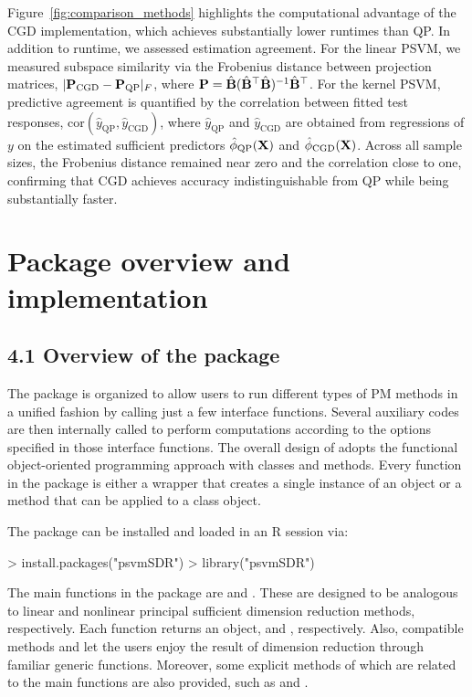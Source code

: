 {Figure~\ref{fig:comparison_methods} highlights the computational advantage of the CGD implementation, which achieves substantially lower runtimes than QP. In addition to runtime, we assessed estimation agreement. For the linear PSVM, we measured subspace similarity via the Frobenius distance between projection matrices, $|{\mathbf{P}}_{\mathrm{CGD}} - {\mathbf{P}}_{\mathrm{QP}}|_F$, where ${\mathbf{P}} = \hat{\mathbf{B}}(\hat{\mathbf{B}}^{\top}\hat{\mathbf{B}})^{-1}\hat{\mathbf{B}}^{\top}$. For the kernel PSVM, predictive agreement is quantified by the correlation between fitted test responses, $ \mathrm{cor}(\hat{y}_{\mathrm{QP}}, \hat{y}_{\mathrm{CGD}})$, where $\hat{y}_{\mathrm{QP}}$ and $\hat{y}_{\mathrm{CGD}}$ are obtained from regressions of $y$ on the estimated sufficient predictors $\hat{\phi}_{\mathrm{QP}}(\mathbf{X})$ and $\hat{\phi}_{\mathrm{CGD}}(\mathbf{X})$. Across all sample sizes, the Frobenius distance remained near zero and the correlation close to one, confirming that CGD achieves accuracy indistinguishable from QP while being substantially faster.}

\section{Package overview and implementation}\label{sec:overview}
\subsection{4.1 Overview of the package }
The  package is organized to allow users to run different types of PM methods in a unified fashion by calling just a few interface functions. Several auxiliary codes are then internally called to perform computations according to the options specified in those interface functions.
The overall design of  adopts the functional object-oriented programming approach \citep{chambers2014::R} with  classes and methods. Every function in the package is either a wrapper that creates a single instance of an object or a method that can be applied to a class object.

The package can be installed and loaded in an R session via:
\begin{example}
 > install.packages("psvmSDR")
 > library("psvmSDR")
\end{example}
The main functions in the package are  and . 
These are designed to be analogous to linear and nonlinear principal sufficient dimension reduction methods, respectively. 
Each function returns an  object,  and , respectively. 
Also, compatible  methods  and  let the users enjoy the result of dimension reduction through familiar generic functions. 
Moreover, some explicit methods of which are related to the main functions are also provided, such as  and .

